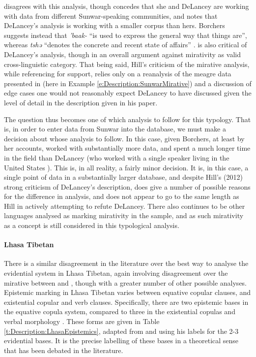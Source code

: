 disagrees with this analysis, though concedes that she and DeLancey are working with data from different Sunwar-speaking communities, and notes that DeLancey's analysis is working with a smaller corpus than hers. Borchers suggests instead that \textit{'baak-} ``is used to express the general way that things are'', whereas \textit{tshə} ``denotes the concrete and recent state of affairs'' \cite[164]{Borchers2008}.  is also critical of DeLancey's analysis, though in an overall argument against mirativity as valid cross-linguistic category. That being said, Hill's criticism of the mirative analysis, while referencing  for support, relies only on a reanalysis of the meagre data presented in  (here in Example \ref{e:Description:SunwarMirative}) and a discussion of edge cases one would not reasonably expect DeLancey to have discussed given the level of detail in the description given in his paper.

The question thus becomes one of which analysis to follow for this typology. That is, in order to enter data from Sunwar into the database, we must make a decision about whose analysis to follow. In this case, given Borchers, at least by her accounts, worked with substantially more data, and spent a much longer time in the field than DeLancey (who worked with a single speaker living in the United States \cite{DeLanceyMirativity1997}). This is, in all reality, a fairly minor decision. It is, in this case, a single point of data in a substantially larger database, and despite Hill's (2012) strong criticism of DeLancey's description,  does give a number of possible reasons for the difference in analysis, and does not appear to go to the same length as Hill in actively attempting to refute DeLancey. There also continues to be other languages analysed as marking mirativity in the sample, and as such mirativity as a concept is still considered in this typological analysis.

\paragraph{Lhasa Tibetan}
There is a similar disagreement in the literature over the best way to analyse the evidential system in Lhasa Tibetan, again involving disagreement over the mirative between  and , though with a greater number of other possible analyses. Epistemic marking in Lhasa Tibetan varies between equative copular clauses, and existential copular and verb clauses. Specifically, there are two epistemic bases in the equative copula system, compared to three in the existential copulas and verbal morphology \cite{DeLancey2017Tibetan}. These forms are given in Table \ref{t:Description:LhasaEpistemics}, adapted from  and using his labels for the 2-3 evidential bases. It is the precise labelling of these bases in a theoretical sense that has been debated in the literature.

